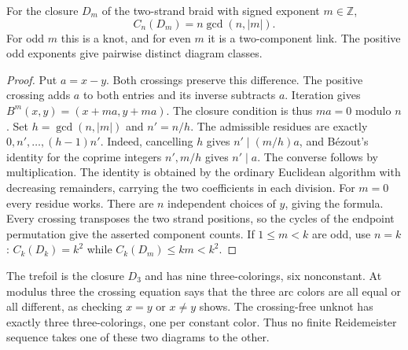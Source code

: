 \begin{theorem}\label{idx-knots65}
For the closure $D_m$ of the two-strand braid with signed exponent
$m\in\mathbb Z$,
\[
                  C_n(D_m)=n\gcd(n,|m|).
\]
For odd $m$ this is a knot, and for even $m$ it is a two-component link.
The positive odd exponents give pairwise distinct diagram classes.
\end{theorem}
\begin{proof}
Put $a=x-y$. Both crossings preserve this difference. The positive
crossing adds $a$ to both entries and its inverse subtracts $a$.
Iteration gives $B^m(x,y)=(x+ma,y+ma)$. The closure condition is thus
$ma=0$ modulo $n$. Set $h=\gcd(n,|m|)$ and $n'=n/h$.
The admissible residues are exactly $0,n',\ldots,(h-1)n'$.
Indeed, cancelling $h$ gives $n'\mid (m/h)a$, and B\'ezout's identity
for the coprime integers $n',m/h$ gives $n'\mid a$. The converse
follows by multiplication. The identity is obtained by the ordinary
Euclidean algorithm with decreasing remainders, carrying the two
coefficients in each division. For $m=0$ every residue works. There are
$n$ independent choices of $y$, giving the formula. Every crossing
transposes the two strand positions, so the cycles of the endpoint
permutation give the asserted component counts. If $1\le m<k$ are odd,
use $n=k$: $C_k(D_k)=k^2$ while $C_k(D_m)\le km<k^2$.
\end{proof}

The trefoil is the closure $D_3$ and has nine three-colorings, six
nonconstant. At modulus three the crossing equation says that the
three arc colors are all equal or all different, as checking $x=y$ or
$x\ne y$ shows. The crossing-free unknot has exactly three
three-colorings, one per constant color. Thus no finite Reidemeister
sequence takes one of these two diagrams to the other.

